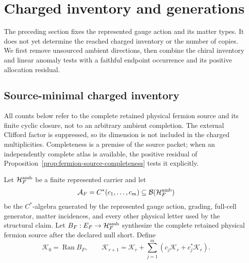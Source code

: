 \documentclass[11pt]{article}
\numberwithin{equation}{section}
\theoremstyle{definition}
\theoremstyle{remark}
\newcommand{\Ran}{\operatorname{Ran}}
\newcommand{\Hh}{\mathcal H}
\begin{document}
\section{Charged inventory and generations}
\label{sec:charged-matter}

The preceding section fixes the represented gauge action and its matter
types.  It does not yet determine the reached charged inventory or the
number of copies.  We first remove unsourced ambient directions, then
combine the chiral inventory and linear anomaly tests with a faithful
endpoint occurrence and its positive allocation residual.


\subsection{Source-minimal charged inventory}
\label{sec:source-minimal-charged-inventory}

All counts below refer to the complete retained physical fermion source and
its finite cyclic closure, not to an arbitrary ambient completion.  The
external Clifford factor is suppressed, so its dimension is not included in
the charged multiplicities.  Completeness is a premise of the source packet;
when an independently complete atlas is available, the positive residual of
Proposition~\ref{prop:fermion-source-completeness} tests it explicitly.

Let $\Hh_F^{\rm amb}$ be a finite represented carrier and let
\begin{equation}
 \mathcal A_F=C^*(c_1,\ldots,c_m)\subseteq\mathcal B(\Hh_F^{\rm amb})
 \label{eq:fermion-loaded-algebra}
\end{equation}
be the $C^*$-algebra generated by the represented gauge action, grading,
full-cell generator, matter incidences, and every other physical letter used by
the structural claim.  Let
$B_F:E_F\to\Hh_F^{\rm amb}$ synthesize the complete retained physical fermion
source after the declared null short.  Define
\begin{equation}
 \mathcal K_0=\Ran B_F,\qquad
 \mathcal K_{r+1}=\mathcal K_r+
 \sum_{j=1}^m(c_j\mathcal K_r+c_j^*\mathcal K_r).
 \label{eq:fermion-cyclic-filtration}
\end{equation}
\end{document}
